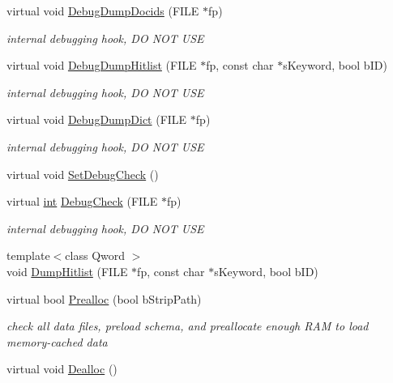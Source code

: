 \begin{DoxyCompactItemize}
virtual void \hyperlink{classCSphIndex__VLN_a5d0c3e9f71f5f562d09a8215ff798991}{Debug\-Dump\-Docids} (F\-I\-L\-E $\ast$fp)
\begin{DoxyCompactList}\small\item\em internal debugging hook, D\-O N\-O\-T U\-S\-E \end{DoxyCompactList}\item 
virtual void \hyperlink{classCSphIndex__VLN_aecfaf0915c7ba4e5688a6e64e2842547}{Debug\-Dump\-Hitlist} (F\-I\-L\-E $\ast$fp, const char $\ast$s\-Keyword, bool b\-I\-D)
\begin{DoxyCompactList}\small\item\em internal debugging hook, D\-O N\-O\-T U\-S\-E \end{DoxyCompactList}\item 
virtual void \hyperlink{classCSphIndex__VLN_a34aa87a7a718c2ba99252ef0987051f5}{Debug\-Dump\-Dict} (F\-I\-L\-E $\ast$fp)
\begin{DoxyCompactList}\small\item\em internal debugging hook, D\-O N\-O\-T U\-S\-E \end{DoxyCompactList}\item 
virtual void \hyperlink{classCSphIndex__VLN_a34ebf8bf93a036d553a4367ed9cbbe37}{Set\-Debug\-Check} ()
\item 
virtual \hyperlink{sphinxexpr_8cpp_a4a26e8f9cb8b736e0c4cbf4d16de985e}{int} \hyperlink{classCSphIndex__VLN_ad36fc39ad4872661b483674862157722}{Debug\-Check} (F\-I\-L\-E $\ast$fp)
\begin{DoxyCompactList}\small\item\em internal debugging hook, D\-O N\-O\-T U\-S\-E \end{DoxyCompactList}\item 
{\footnotesize template$<$class Qword $>$ }\\void \hyperlink{classCSphIndex__VLN_afbde34e20a9723c42f35389216913486}{Dump\-Hitlist} (F\-I\-L\-E $\ast$fp, const char $\ast$s\-Keyword, bool b\-I\-D)
\item 
virtual bool \hyperlink{classCSphIndex__VLN_a705c4100e5340e1bd6a7eec6e6275964}{Prealloc} (bool b\-Strip\-Path)
\begin{DoxyCompactList}\small\item\em check all data files, preload schema, and preallocate enough R\-A\-M to load memory-\/cached data \end{DoxyCompactList}\item 
virtual void \hyperlink{classCSphIndex__VLN_a37b03701193ed45aaeef50cd420a7cd3}{Dealloc} ()

\end{DoxyCompactItemize}
